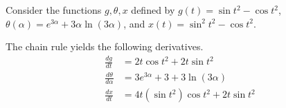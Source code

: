 \begin{answer}
	Consider the functions $g,\theta,x$ defined by $g(t) = \sin t^2 - \cos t^2$, $\theta(\alpha) = e^{3 \alpha} + 3 \alpha \ln \left(3 \alpha\right)$, and $x(t) = \sin^2 t^2 - \cos t^2$.

	The chain rule yields the following derivatives.
	\begin{align*}
		\frac{dg}{dt}           & = 2t \cos t^2 + 2t \sin t^2                      \\
		\frac{d\theta}{d\alpha} & = 3 e^{3\alpha} + 3 + 3\ln \left(3 \alpha\right) \\
		\frac{dx}{dt}           & = 4t(\sin t^2)\cos t^2 + 2t \sin t^2
	\end{align*}
\end{answer}

